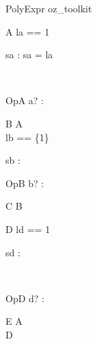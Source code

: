 \begin{zsection}
  \SECTION PolyExpr \parents oz\_toolkit
\end{zsection}

\begin{class}{A}
  la == 1\\
  \begin{state}
    sa : \nat
  \where
    sa = la
  \end{state}\\
  \begin{op}{OpA}
    a? : \nat
  \end{op}
\end{class}

\begin{class}{B}
  A\\
  lb == \{1\}\\
  \begin{state}
    sb : \power \nat
  \end{state}
  \begin{op}{OpB}
    b? : \power \nat
  \end{op}
\end{class}

\begin{class}{C}
  B
\end{class}

\begin{class}{D}
  ld == 1\\
  \begin{state}
    sd : \nat
  \end{state}\\
  \begin{op}{OpD}
    d? : \nat
  \end{op}
\end{class}

\begin{class}{E}
 A\\
 D
\end{class}

